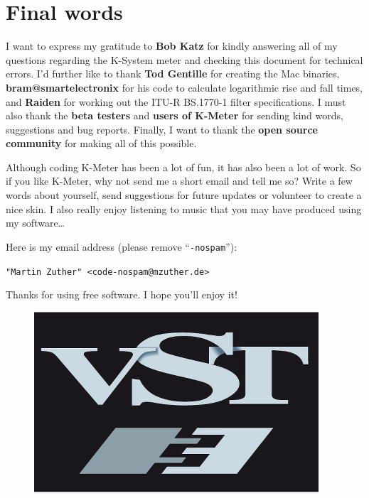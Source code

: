 \chapter{Final words}
\label{chap:final_words}

I want to express my gratitude to \textbf{Bob Katz} for kindly
answering all of my questions regarding the K-System meter and
checking this document for technical errors.  I'd further like to
thank \textbf{Tod Gentille} for creating the Mac binaries,
\textbf{bram@smartelectronix} for his code to calculate logarithmic
rise and fall times, and \textbf{Raiden} for working out the ITU-R
BS.1770-1 filter specifications.  I must also thank the \textbf{beta
  testers} and \textbf{users of K-Meter} for sending kind words,
suggestions and bug reports.  Finally, I want to thank the
\textbf{open source community} for making all of this possible.

Although coding K-Meter has been a lot of fun, it has also been a lot
of work.  So if you like K-Meter, why not send me a short email and
tell me so?  Write a few words about yourself, send suggestions for
future updates or volunteer to create a nice skin.  I also really
enjoy listening to music that you may have produced using my
software\dots

Here is my email address (please remove ``\texttt{-nospam}''):

\begin{center}
  \texttt{"Martin Zuther" <code-nospam@mzuther.de>}
\end{center}

Thanks for using free software.  I hope you'll enjoy it!

\begin{figure}
  \includegraphics[scale=0.40,clip]{include/images/trademark_vst.png}
\end{figure}

